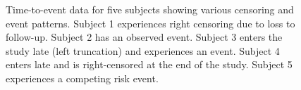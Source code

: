 \begin{figure}[htbp]
    \caption{Time-to-event data for five subjects showing various censoring and event patterns. Subject 1 experiences right censoring due to loss to follow-up. Subject 2 has an observed event. Subject 3 enters the study late (left truncation) and experiences an event. Subject 4 enters late and is right-censored at the end of the study. Subject 5 experiences a competing risk event.}
    \label{fig:time-to-event-subjects}
\end{figure}


